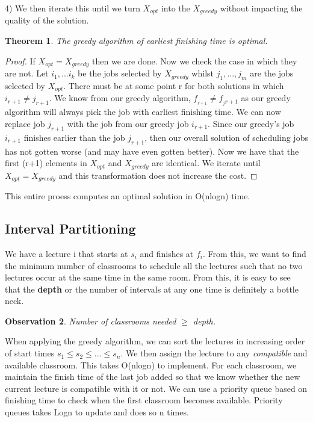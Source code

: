 \documentclass[11pt, oneside]{article}
\newtheorem{theorem}{Theorem}
\newtheorem{observation}[theorem]{\textbf{Observation}}
\theoremstyle{definition}
\begin{document}
4) We then iterate this until we turn $X_{opt}$ into the $X_{greedy}$ without impacting the quality of the solution.

\begin{theorem}
  The greedy algorithm of earliest finishing time is optimal.
\end{theorem}
\begin{proof}
  If $X_{opt} = X_{greedy}$ then we are done. Now we check the case in which they are not. Let $i_1,...i_k$ be the jobs selected by $X_{greedy}$ whilst $j_1,...,j_m$ are the jobs selected by $X_{opt}$. There must be at some point r for both solutions in which $i_{r+1} \neq j_{r+1}$. We know from our greedy algorithm, $f_{_{r+1}} \neq f_{_j{r+1}}$ as our greedy algorithm will always pick the job with earliest finishing time. We can now replace job $j_{r+1}$ with the job from our greedy job $i_{r+1}$. Since our greedy's job $i_{r+1}$ finishes earlier than the job $j_{r+1}$, then our overall solution of scheduling jobs has not gotten worse (and may have even gotten better). Now we have that the first (r+1) elements in $X_{opt}$ and $X_{greedy}$ are identical. We iterate until $X_{opt} = X_{greedy}$ and this transformation does not increase the cost.
\end{proof}
This entire proess computes an optimal solution in O(nlogn) time.

\subsection{Interval Partitioning}
We have a lecture i that starts at $s_i$ and finishes at $f_i$. From this, we want to find the minimum number of classrooms to schedule all the lectures such that no two lectures occur at the same time in the same room. From this, it is easy to see that the \textbf{depth} or the number of intervals at any one time is definitely a bottle neck.

\begin{observation}
  Number of classrooms needed $\geq$ depth.
\end{observation}
When applying the greedy algorithm, we can sort the lectures in increasing order of start times $s_1 \leq s_2 \leq ... \leq s_n$. We then assign the lecture to any \textit{compatible} and available classroom. This takes O(nlogn) to implement. For each classroom, we maintain the finish time of the last job added so that we know whether the new current lecture is compatible with it or not. We can use a priority queue based on finishing time to check when the first classroom becomes available. Priority queues takes Logn to update and does so n times.
\end{document}
